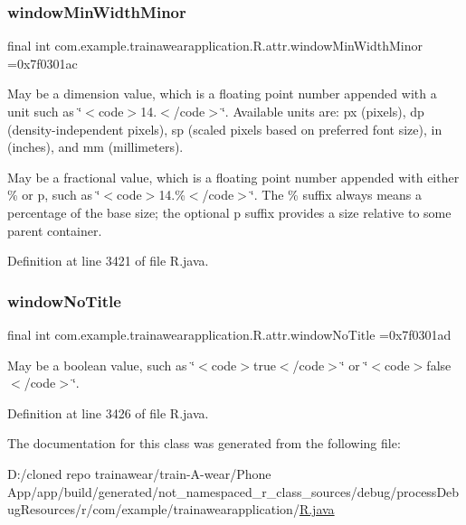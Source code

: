 \subsubsection{\texorpdfstring{windowMinWidthMinor}{windowMinWidthMinor}}
{\footnotesize\ttfamily final int com.\+example.\+trainawearapplication.\+R.\+attr.\+window\+Min\+Width\+Minor =0x7f0301ac\hspace{0.3cm}{\ttfamily [static]}}

May be a dimension value, which is a floating point number appended with a unit such as \char`\"{}$<$code$>$14.\+5sp$<$/code$>$\char`\"{}. Available units are\+: px (pixels), dp (density-\/independent pixels), sp (scaled pixels based on preferred font size), in (inches), and mm (millimeters). 

May be a fractional value, which is a floating point number appended with either \% or p, such as \char`\"{}$<$code$>$14.\%$<$/code$>$\char`\"{}. The \% suffix always means a percentage of the base size; the optional p suffix provides a size relative to some parent container. 

Definition at line 3421 of file R.\+java.

\mbox{\label{classcom_1_1example_1_1trainawearapplication_1_1_r_1_1attr_a2b566635d5ee696b197c292fd1245839}} 
\subsubsection{\texorpdfstring{windowNoTitle}{windowNoTitle}}
{\footnotesize\ttfamily final int com.\+example.\+trainawearapplication.\+R.\+attr.\+window\+No\+Title =0x7f0301ad\hspace{0.3cm}{\ttfamily [static]}}

May be a boolean value, such as \char`\"{}$<$code$>$true$<$/code$>$\char`\"{} or \char`\"{}$<$code$>$false$<$/code$>$\char`\"{}. 

Definition at line 3426 of file R.\+java.



The documentation for this class was generated from the following file\+:\begin{DoxyCompactItemize}
\item 
D\+:/cloned repo trainawear/train-\/\+A-\/wear/\+Phone App/app/build/generated/not\+\_\+namespaced\+\_\+r\+\_\+class\+\_\+sources/debug/process\+Debug\+Resources/r/com/example/trainawearapplication/\mbox{\hyperlink{process_debug_resources_2r_2com_2example_2trainawearapplication_2_r_8java}{R.\+java}}\end{DoxyCompactItemize}
